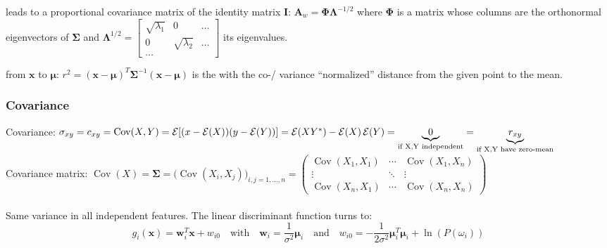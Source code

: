    leads to a proportional covariance matrix of the identity matrix $\mathbf{I}$:
  $\mathbf{A}_w = \boldsymbol{\Phi} \boldsymbol{\Lambda}^{-1/2}$ 
  where $\mathbf{\Phi}$ is a matrix whose columns are the orthonormal eigenvectors of 
  $\mathbf{\Sigma}$ and $\mathbf{\Lambda}^{1/2}=\begin{bmatrix}
  \sqrt{\lambda_1}& 0 & \ldots \\
  0&\sqrt{\lambda_2}&\ldots\\
  \ldots
  \end{bmatrix}$ its eigenvalues.
  
   from $\mathbf{x}$ to $\boldsymbol{\mu}$: $r^2 = (\mathbf{x}-\boldsymbol{\mu})^T \boldsymbol{\Sigma}^{-1} (\mathbf{x}-\boldsymbol{\mu})$ 
  is the with the co-/ variance ``normalized'' distance from the given point to the mean.
  
  
  \subsubsection{Covariance}  
  Covariance: $\sigma_{xy} = c_{xy}= \operatorname{Cov}(X,Y) = \operatorname{\mathcal{E}}[(x-\operatorname{\mathcal{E}}(X))(y-\operatorname{\mathcal{E}}(Y))] = \operatorname{\mathcal{E}}(XY^*)-\operatorname{\mathcal{E}}(X)\operatorname{\mathcal{E}}(Y)= \underbrace{0}_{\text{if X,Y independent}}= \underbrace{r_{xy}}_{\text{if X,Y have zero-mean}}$
  \\
  Covariance matrix: $\operatorname{Cov}(X) = \mathbf{\Sigma} = 
  \bigl(\operatorname{Cov}(X_i, X_j)\bigr)_{i,j=1,\ldots,n} = \begin{pmatrix} 
\operatorname{Cov}(X_1,X_1) & \cdots & \operatorname{Cov}(X_1,X_n) \\
\vdots & \ddots & \vdots \\
\operatorname{Cov}(X_n,X_1) & \cdots& \operatorname{Cov}(X_n,X_n)\end{pmatrix}$\\


  \label{sec:bayes_discriminant_function}
  \\
  Same variance in all independent features.
  The linear discriminant function turns to: 
  $$g_i(\mathbf{x}) = \mathbf{w}_i^T \mathbf{x} + w_{i0} \quad \text{with} \quad
  \mathbf{w}_i = \frac{1}{\sigma^2}\boldsymbol{\mu}_i \quad \text{and} \quad 
  w_{i0} = -\frac{1}{2\sigma^2} \boldsymbol{\mu}_i^T \boldsymbol{\mu}_i + \ln(P(\omega_i))$$
  
